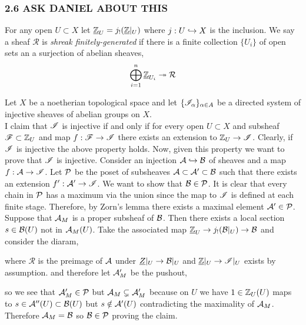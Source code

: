 \documentclass[12pt]{article}
\begin{document}
\subsubsection{2.6 ASK DANIEL ABOUT THIS}

\newcommand{\cR}{\mathcal{R}}
\newcommand{\sR}{\mathscr{R}}

\begin{defn}
For any open $U \subset X$ let $\underline{\mathbb{Z}}_U = j_!(\underline{\mathbb{Z}}|_U)$ where $j : U \hookrightarrow X$ is the inclusion. We say a sheaf $\cR$ is \textit{shreak finitely-generated} if there is a finite collection $\{ U_i \}$ of open sets an a surjection of abelian sheaves,
\[ \bigoplus_{i = 1}^n \underline{\Z}_{U_i} \onto \cR \]
\end{defn}

\noindent
Let $X$ be a noetherian topological space and let $\{ \mathscr{I}_\alpha \}_{\alpha \in A}$ be a directed system of injective sheaves of abelian groups on $X$. 
\bigskip\\
I claim that $\mathscr{I}$ is injective if and only if for every open $U \subset X$ and subsheaf $\mathscr{F} \subset \mathbb{Z}_U$ and map $f : \mathscr{F} \to \mathscr{I}$ there exists an extension to $\mathbb{Z}_U \to \mathscr{I}$. 
Clearly, if $\mathscr{I}$ is injective the above property holds. Now, given this property we want to prove that $\mathscr{I}$ is injective. Consider an injection $\mathcal{A} \hookrightarrow \mathcal{B}$ of sheaves and a map $f : \mathcal{A} \to \mathscr{I}$. Let $\mathcal{P}$ be the poset of subsheaves $\mathcal{A} \subset \mathcal{A}' \subset \mathcal{B}$ such that there exists an extension $f' : \mathcal{A}' \to \mathscr{I}$. We want to show that $\mathcal{B} \in \mathcal{P}$. It is clear that every chain in $\mathcal{P}$ has a maximum via the union since the map to $\mathscr{I}$ is defined at each finite stage. Therefore, by Zorn's lemma there exists a maximal element $\mathcal{A}' \in \mathcal{P}$. Suppose that $\mathcal{A}_M$ is a proper subsheaf of $\mathcal{B}$. Then there exists a local section $s \in \mathcal{B}(U)$ not in $\mathcal{A}_M(U)$. Take the associated map $\underline{\mathbb{Z}}_U \to j_!(\mathcal{B}|_U) \to \mathcal{B}$ and consider the diaram,
\begin{center}
\end{center}
where $\cR$ is the preimage of $\mathcal{A}$ under $\underline{Z}|_U \to \mathcal{B}|_U$ and $\underline{\mathbb{Z}}|_U \to \mathscr{I}|_U$ exists by assumption. 
and therefore let $\mathcal{A}_M'$ be the pushout,
\begin{center}
\end{center}
so we see that $\mathcal{A}_M' \in \mathcal{P}$ but $\mathcal{A}_M \subsetneq \mathcal{A}_M'$ because on $U$ we have $1 \in \mathbb{Z}_U(U)$ maps to $s \in \mathcal{A}''(U) \subset \mathcal{B}(U)$ but $s \notin \mathcal{A}'(U)$ contradicting the maximality of $\mathcal{A}_M$. Therefore $\mathcal{A}_M = \mathcal{B}$ so $\mathcal{B} \in \mathcal{P}$ proving the claim. 
\end{document}
